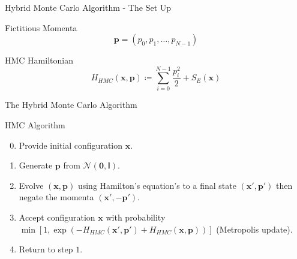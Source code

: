 \documentclass{beamer}
\begin{document}
    \begin{frame}{Hybrid Monte Carlo Algorithm - The Set Up}
        {
            \begin{block}{Fictitious Momenta}
            {
                \begin{equation*}
                    \label{eq:FictitiousMomenta}
                    \bm{p} = \left(p_0,p_1,\dots,p_{N-1}\right)
                \end{equation*}
            }
            \end{block}
        }
        {
            \begin{block}{HMC Hamiltonian}
                {
                \begin{equation*}
                    \label{eq:HMCHamiltonian}
                    H_{HMC}\left(\bm{x},\bm{p}\right) \coloneqq \sum_{i=0}^{N-1} \frac{ p_{i}^{2} } {2} + S_{E}\left(\bm{x}\right)
                \end{equation*}
                }
            \end{block}
        }
    \end{frame}
    \begin{frame}{The Hybrid Monte Carlo Algorithm}
        {
            \begin{block}{HMC Algorithm}
                \begin{enumerate} 
                    \setcounter{enumi}{-1}

                    \item<1-> Provide initial configuration $\bm{x}$.

                    \item<2-> Generate $\bm{p}$ from $\mathcal{N}\left(\bm{0},\mathbb{I}\right)$.

                    \item<3-> Evolve $\left(\bm{x}, \bm{p}\right)$ using Hamilton's equation's to a final state $\left(\bm{x}', \bm{p}'\right)$ then negate the momenta $\left(\bm{x}', -\bm{p}'\right)$.

                    \item<4-> Accept configuration $\bm{x}$ with probability $ \min{\left[1,\exp{\left(-H_{HMC}\left(\bm{x}',\bm{p}'\right)+H_{HMC}\left(\bm{x},\bm{p}\right)\right)}\right]}$ (Metropolis update).

                    \item<5-> Return to step $1$.
                \end{enumerate}
            \end{block}
        } 
    \end{frame}
\end{document}
